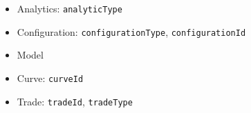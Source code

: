 \begin{itemize}
  \item Analytics: \lstinline!analyticType!
  \item Configuration: \lstinline!configurationType!, \lstinline!configurationId!
  \item Model
  \item Curve: \lstinline!curveId!
  \item Trade: \lstinline!tradeId!, \lstinline!tradeType!
\end{itemize}


